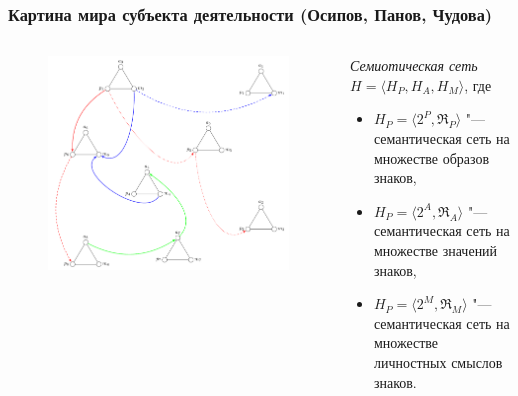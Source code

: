 \documentclass[default]{beamer}
\begin{document}
	\begin{frame}
		\frametitle{Картина мира субъекта деятельности \footnotesize (Осипов, Панов, Чудова)}
		
		\begin{columns}
			\begin{column}{0.55\textwidth}
				\begin{figure}
					\includegraphics[width=\textwidth]{signs/signs_net}
				\end{figure}
			\end{column}
			\begin{column}{0.45\textwidth}
				\textit{Семиотическая сеть} $H=\langle H_P, H_A, H_M\rangle$, где
				\begin{itemize}
					\item $H_P=\langle2^P,\mathfrak R_P\rangle$ "--- семантическая сеть на множестве образов знаков,
					\item $H_P=\langle2^A,\mathfrak R_A\rangle$ "--- семантическая сеть на множестве значений знаков,
					\item $H_P=\langle2^M,\mathfrak R_M\rangle$ "--- семантическая сеть на множестве личностных смыслов знаков.
				\end{itemize}
			\end{column}
		\end{columns}
	\end{frame}	
\end{document}
